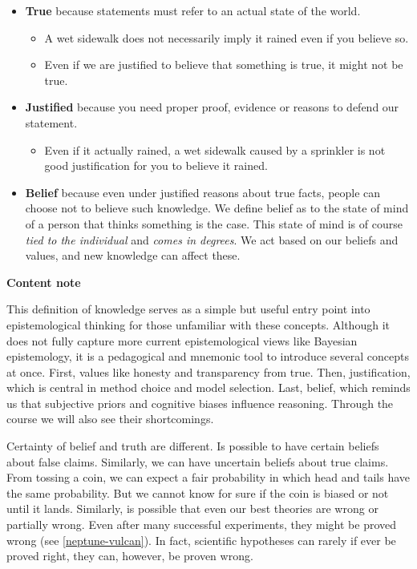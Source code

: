 \documentclass[
  12pt,
]{book}
\providecommand{\tightlist}{%
  \setlength{\itemsep}{0pt}\setlength{\parskip}{0pt}}
\begin{document}
\begin{itemize}
\tightlist
\item
  \textbf{True} because statements must refer to an actual state of the world.

  \begin{itemize}
  \tightlist
  \item
    A wet sidewalk does not necessarily imply it rained even if you believe so.
  \item
    Even if we are justified to believe that something is true, it might not be true.
  \end{itemize}
\item
  \textbf{Justified} because you need proper proof, evidence or reasons to defend our statement.

  \begin{itemize}
  \tightlist
  \item
    Even if it actually rained, a wet sidewalk caused by a sprinkler is not good justification for you to believe it rained.
  \end{itemize}
\item
  \textbf{Belief} because even under justified reasons about true facts, people can choose not to believe such knowledge. We define belief as to the state of mind of a person that thinks something is the case. This state of mind is of course \emph{tied to the individual} and \emph{comes in degrees}. We act based on our beliefs and values, and new knowledge can affect these.
\end{itemize}

\begin{simplebox}

\textbf{Content note}

This definition of knowledge serves as a simple but useful entry point into epistemological thinking for those unfamiliar with these concepts. Although it does not fully capture more current epistemological views like Bayesian epistemology, it is a pedagogical and mnemonic tool to introduce several concepts at once. First, values like honesty and transparency from true. Then, justification, which is central in method choice and model selection. Last, belief, which reminds us that subjective priors and cognitive biases influence reasoning. Through the course we will also see their shortcomings.

\end{simplebox}

Certainty of belief and truth are different. Is possible to have certain beliefs about false claims.
Similarly, we can have uncertain beliefs about true claims. From tossing a coin, we can expect a fair probability in which head and tails have the same probability. But we cannot know for sure if the coin is biased or not until it lands. Similarly, is possible that even our best theories are wrong or partially wrong. Even after many successful experiments, they might be proved wrong (see \ref{neptune-vulcan}). In fact, scientific hypotheses can rarely if ever be proved right, they can, however, be proven wrong.
\end{document}
